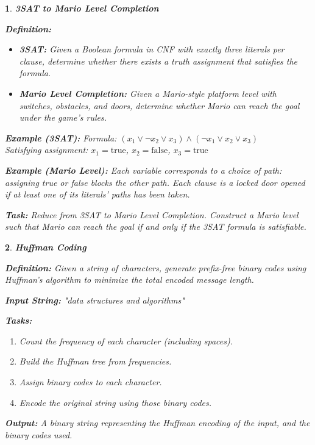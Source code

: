 \documentclass[%
addpoints]{exam}
\theoremstyle{problem}
\newtheorem{p}{}
\begin{document}
\begin{p}
\textbf{3SAT to Mario Level Completion}

\textbf{Definition:}
\begin{itemize}
\item \textbf{3SAT:} Given a Boolean formula in CNF with exactly three literals per clause, determine whether there exists a truth assignment that satisfies the formula.
\item \textbf{Mario Level Completion:} Given a Mario-style platform level with switches, obstacles, and doors, determine whether Mario can reach the goal under the game's rules.
\end{itemize}

\textbf{Example (3SAT):} Formula: $(x_1 \vee \neg x_2 \vee x_3) \wedge (\neg x_1 \vee x_2 \vee x_3)$\\
Satisfying assignment: $x_1 = \text{true}$, $x_2 = \text{false}$, $x_3 = \text{true}$

\textbf{Example (Mario Level):} Each variable corresponds to a choice of path: assigning true or false blocks the other path. Each clause is a locked door opened if at least one of its literals' paths has been taken.

\textbf{Task:} Reduce from 3SAT to Mario Level Completion. Construct a Mario level such that Mario can reach the goal if and only if the 3SAT formula is satisfiable.
\hfill \end{p}

\begin{p}
\textbf{Huffman Coding}

\textbf{Definition:} Given a string of characters, generate prefix-free binary codes using Huffman's algorithm to minimize the total encoded message length.

\textbf{Input String:} "data structures and algorithms"

\textbf{Tasks:}
\begin{enumerate}
\item Count the frequency of each character (including spaces).
\item Build the Huffman tree from frequencies.
\item Assign binary codes to each character.
\item Encode the original string using those binary codes.
\end{enumerate}

\textbf{Output:} A binary string representing the Huffman encoding of the input, and the binary codes used.
\hfill \end{p}
\end{document}
